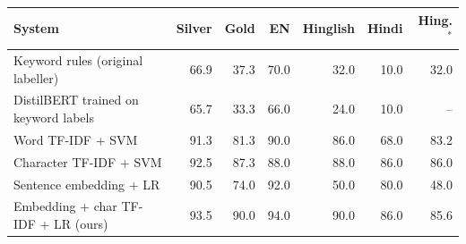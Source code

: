 \begin{tabular}{lrrrrrr}
\toprule
System & Silver & Gold & EN & Hinglish & Hindi & Hing.$^{*}$ \\
\midrule
Keyword rules (original labeller) & 66.9 & 37.3 & 70.0 & 32.0 & 10.0 & 32.0 \\
DistilBERT trained on keyword labels & 65.7 & 33.3 & 66.0 & 24.0 & 10.0 & -- \\
Word TF-IDF + SVM & 91.3 & 81.3 & 90.0 & 86.0 & 68.0 & 83.2 \\
Character TF-IDF + SVM & 92.5 & 87.3 & 88.0 & 88.0 & 86.0 & 86.0 \\
Sentence embedding + LR & 90.5 & 74.0 & 92.0 & 50.0 & 80.0 & 48.0 \\
\rowcolor{gray!15} Embedding + char TF-IDF + LR (ours) & 93.5 & 90.0 & 94.0 & 90.0 & 86.0 & 85.6 \\
\bottomrule
\end{tabular}